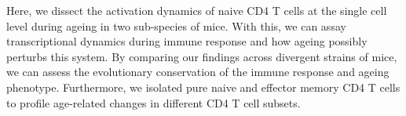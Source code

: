 Here, we dissect the activation dynamics of naive CD4\plus{} T cells at the single cell level during ageing in two sub-species of mice. With this, we can assay transcriptional dynamics during immune response and how ageing possibly perturbs this system. By comparing our findings across divergent strains of mice, we can assess the evolutionary conservation of the immune response and ageing phenotype. Furthermore, we isolated pure naive and effector memory CD4\plus{} T cells to profile age-related changes in different CD4\plus{} T cell subsets.
